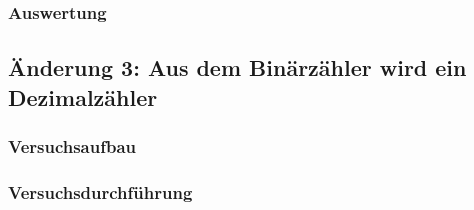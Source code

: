 \documentclass[12pt,a4paper]{article}
\begin{document}
\subsubsection*{Auswertung}

\subsection{Änderung 3: Aus dem Binärzähler wird ein Dezimalzähler}

\subsubsection*{Versuchsaufbau}

\subsubsection*{Versuchsdurchführung}
\end{document}
